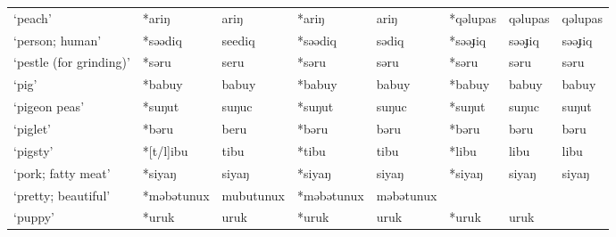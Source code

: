 \begin{landscape}
\begin{longtable}[c]{@{}p{3cm}<{\raggedright}p{2.75cm}<{\raggedright}p{2.75cm}<{\raggedright}p{2.75cm}<{\raggedright}p{2.75cm}<{\raggedright}p{2.75cm}<{\raggedright}p{2.75cm}<{\raggedright}p{2.75cm}<{\raggedright}@{}}
`peach'                                              & *ariŋ        & ariŋ                          & *ariŋ          & ariŋ                       & *qəlupas         & qəlupas                  & qəlupas                           \\
`person; human'                             & *səədiq      & seediq                        & *səədiq        & sədiq                      & *səəɟiq          & səəɟiq                   & səəɟiq                            \\
`pestle (for grinding)'                              & *səru        & seru                          & *səru          & səru                       & *səru            & səru                     & səru                              \\
`pig'                                                & *babuy       & babuy                         & *babuy         & babuy                      & *babuy           & babuy                    & babuy                             \\
`pigeon peas'                                        & *suŋut       & suŋuc                         & *suŋut         & suŋuc                      & *suŋut           & suŋuc                    & suŋut                             \\
`piglet'                                             & *bəru        & beru                          & *bəru          & bəru                       & *bəru            & bəru                     & bəru                              \\
`pigsty'                                             & *[t/l]ibu    & tibu                          & *tibu          & tibu                       & *libu            & libu                     & libu                              \\
`pork; fatty meat'                                   & *siyaŋ       & siyaŋ                         & *siyaŋ         & siyaŋ                      & *siyaŋ           & siyaŋ                    & siyaŋ                             \\
`pretty; beautiful'                                  & *məbətunux   & mubutunux                     & *məbətunux     & məbətunux                  &                  &                          &                                   \\
`puppy'                                              & *uruk        & uruk                          & *uruk          & uruk                       & *uruk            & uruk                     &                                   \\

\end{longtable}
\end{landscape}
